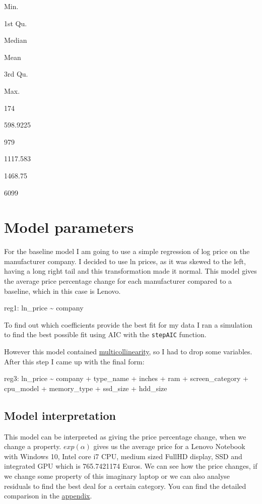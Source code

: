 \documentclass[
]{article}
\begin{document}
Min.

1st Qu.

Median

Mean

3rd Qu.

Max.

174

598.9225

979

1117.583

1468.75

6099

\hypertarget{model-parameters}{%
\section{Model parameters}\label{model-parameters}}

For the baseline model I am going to use a simple regression of log
price on the manufacturer company. I decided to use ln prices, as it was
skewed to the left, having a long right tail and this transformation
made it normal. This model gives the average price percentage change for
each manufacturer compared to a baseline, which in this case is Lenovo.

reg1: ln\_price \textasciitilde{} company

To find out which coefficients provide the best fit for my data I ran a
simulation to find the best possible fit using AIC with the
\texttt{stepAIC} function.

However this model contained
\protect\hyperlink{multicollinearity}{multicollinearity}, so I had to
drop some variables. After this step I came up with the final form:

reg3: ln\_price \textasciitilde{} company + type\_name + inches + ram +
screen\_category + cpu\_model + memory\_type + ssd\_size + hdd\_size

\hypertarget{model-interpretation}{%
\subsection{Model interpretation}\label{model-interpretation}}

This model can be interpreted as giving the price percentage change,
when we change a property. \(exp(\alpha)\) gives us the average price
for a Lenovo Notebook with Windows 10, Intel core i7 CPU, medium sized
FullHD display, SSD and integrated GPU which is 765.7421174 Euros. We
can see how the price changes, if we change some property of this
imaginary laptop or we can also analyse residuals to find the best deal
for a certain category. You can find the detailed comparison in the
\protect\hyperlink{detailed-model-comparison}{appendix}.
\end{document}

